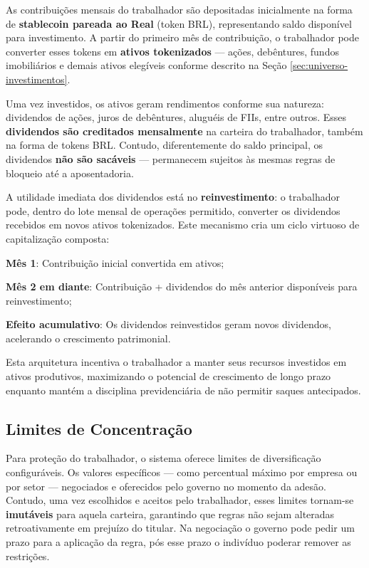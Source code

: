 As contribuições mensais do trabalhador são depositadas inicialmente na forma de \textbf{stablecoin pareada ao Real} (token BRL), representando saldo disponível para investimento. A partir do primeiro mês de contribuição, o trabalhador pode converter esses tokens em \textbf{ativos tokenizados} --- ações, debêntures, fundos imobiliários e demais ativos elegíveis conforme descrito na Seção \ref{sec:universo-investimentos}.

Uma vez investidos, os ativos geram rendimentos conforme sua natureza: dividendos de ações, juros de debêntures, aluguéis de FIIs, entre outros. Esses \textbf{dividendos são creditados mensalmente} na carteira do trabalhador, também na forma de tokens BRL. Contudo, diferentemente do saldo principal, os dividendos \textbf{não são sacáveis} --- permanecem sujeitos às mesmas regras de bloqueio até a aposentadoria.

A utilidade imediata dos dividendos está no \textbf{reinvestimento}: o trabalhador pode, dentro do lote mensal de operações permitido, converter os dividendos recebidos em novos ativos tokenizados. Este mecanismo cria um ciclo virtuoso de capitalização composta:

\begin{alineas}
    \item \textbf{Mês 1}: Contribuição inicial convertida em ativos;
    \item \textbf{Mês 2 em diante}: Contribuição + dividendos do mês anterior disponíveis para reinvestimento;
    \item \textbf{Efeito acumulativo}: Os dividendos reinvestidos geram novos dividendos, acelerando o crescimento patrimonial.
\end{alineas}

Esta arquitetura incentiva o trabalhador a manter seus recursos investidos em ativos produtivos, maximizando o potencial de crescimento de longo prazo enquanto mantém a disciplina previdenciária de não permitir saques antecipados.

\subsection{Limites de Concentração}

Para proteção do trabalhador, o sistema oferece limites de diversificação configuráveis. Os valores específicos --- como percentual máximo por empresa ou por setor --- negociados e oferecidos pelo governo no momento da adesão. Contudo, uma vez escolhidos e aceitos pelo trabalhador, esses limites tornam-se \textbf{imutáveis} para aquela carteira, garantindo que regras não sejam alteradas retroativamente em prejuízo do titular. Na negociação o governo pode pedir um prazo para a aplicação da regra, pós esse prazo o indivíduo poderar remover as restrições.

